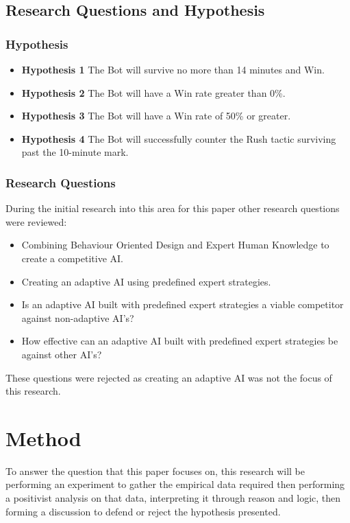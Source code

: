 \documentclass[journal]{IEEEtran}
\begin{document}
	\subsection{Research Questions and Hypothesis}
	
	\subsubsection{Hypothesis}
	\begin{itemize}
		\item \textbf{Hypothesis 1} The Bot will survive no more than 14 minutes and Win.
		\item \textbf{Hypothesis 2} The Bot will have a Win rate greater than 0\%.
		\item \textbf{Hypothesis 3} The Bot will have a Win rate of 50\% or greater.    
		\item \textbf{Hypothesis 4} The Bot will successfully counter the Rush tactic surviving past the 10-minute mark.
	\end{itemize}
	
	\subsubsection{Research Questions}
	During the initial research into this area for this paper other research questions were reviewed:
	\begin{itemize}
		\item Combining Behaviour Oriented Design and Expert Human Knowledge to create a competitive AI.
		
		\item Creating an adaptive AI using predefined expert strategies. 
		
		\item Is an adaptive AI built with predefined expert strategies a viable competitor against non-adaptive AI’s?
		
		\item How effective can an adaptive AI built with predefined expert strategies be against other AI’s?    
	\end{itemize}
	These questions were rejected as creating an adaptive AI was not the focus of this research.
	\newline
	
	\section{Method}
	To answer the question that this paper focuses on, this research will be performing an experiment to gather the empirical data required then performing a positivist analysis on that data, interpreting it through reason and logic, then forming a discussion to defend or reject the hypothesis presented.
	
\end{document}
